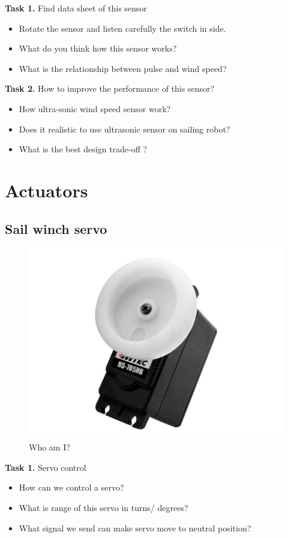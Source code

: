 \documentclass[]{article}
\begin{document}
 \textbf{Task 1.} Find data sheet of this sensor
 \begin{itemize}
 	\item Rotate the sensor and listen carefully the switch in side.
 	\item What do you think how this sensor works?
 	\item What is the relationship between pulse and wind speed?
 \end{itemize}

\textbf{Task 2.} How to improve the performance of this sensor?
\begin{itemize}
	\item How ultra-sonic wind speed sensor work?
	\item Does it realistic to use ultrasonic sensor on sailing robot?
	\item What is the best design trade-off ? 
\end{itemize}

\section{Actuators}
\subsection{Sail winch servo}
\begin{figure}[h]
\centering
\includegraphics[width=0.7\linewidth]{winch}
\caption{Who am I?}
\label{fig:winch}
\end{figure}
\textbf{Task 1.} Servo control 
\begin{itemize}
	\item How can we control a servo?
	\item What is range of this servo in turns/ degrees?
	\item What signal we send can make servo move to neutral position? 
\end{itemize}
\end{document}
